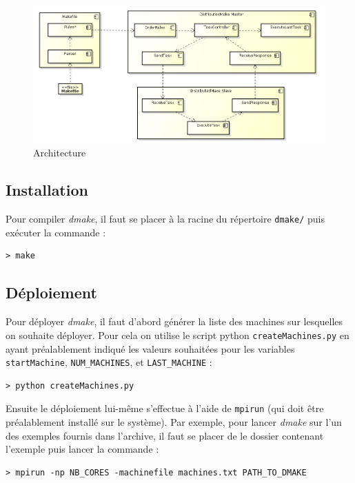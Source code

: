 \documentclass[a4paper,12pt,twoside]{article}
\begin{document}
\begin{figure}[H]
  \centering
  \includegraphics[scale=0.4]{schema.png}
  \caption{Architecture}
  \label{fig:architecture}
\end{figure}

\subsection{Installation}

Pour compiler \emph{dmake}, il faut se placer à la racine du
répertoire \texttt{dmake/} puis exécuter la commande :
\begin{verbatim}
> make
\end{verbatim}

\subsection{Déploiement}

Pour déployer \emph{dmake}, il faut d'abord générer la liste des
machines sur lesquelles on souhaite déployer. Pour cela on utilise le
script python \texttt{createMachines.py} en ayant préalablement indiqué
les valeurs souhaitées pour les variables \texttt{startMachine},
\texttt{NUM\_MACHINES}, et \texttt{LAST\_MACHINE} : 
\begin{verbatim}
> python createMachines.py
\end{verbatim}

Ensuite le déploiement lui-même s'effectue à l'aide de
\texttt{mpirun} (qui doit être préalablement installé sur le système). Par exemple, pour lancer \emph{dmake} sur l'un des
exemples fournis dans l'archive, il faut se placer de le dossier
contenant l'exemple puis lancer la commande :
\begin{verbatim}
> mpirun -np NB_CORES -machinefile machines.txt PATH_TO_DMAKE
\end{verbatim}
\end{document}
